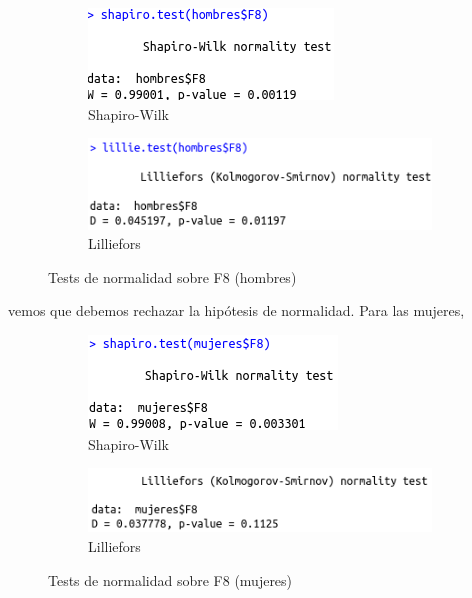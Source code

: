 \begin{figure}[H]
	\centering
	\begin{subfigure}{.5\textwidth}
		\centering
		\includegraphics[width=.6\linewidth]{swh-F8.png}
		\caption{Shapiro-Wilk}
		\label{fig:swh-F8}
	\end{subfigure}%
	\begin{subfigure}{.5\textwidth}
		\centering
		\includegraphics[width=.6\linewidth]{lh-F8.png}
		\caption{Lilliefors}
		\label{fig:lh-F8}
	\end{subfigure}
	\caption{Tests de normalidad sobre F8 (hombres)}
	\label{fig:normhF8}
\end{figure}

vemos que debemos rechazar la hipótesis de normalidad. Para las mujeres,

\begin{figure}[H]
	\centering
	\begin{subfigure}{.5\textwidth}
		\centering
		\includegraphics[width=.6\linewidth]{swm-F8.png}
		\caption{Shapiro-Wilk}
		\label{fig:swm-F8}
	\end{subfigure}%
	\begin{subfigure}{.5\textwidth}
		\centering
		\includegraphics[width=.6\linewidth]{lm-F8.png}
		\caption{Lilliefors}
		\label{fig:lm-F8}
	\end{subfigure}
	\caption{Tests de normalidad sobre F8 (mujeres)}
	\label{fig:normmF8}
\end{figure}

